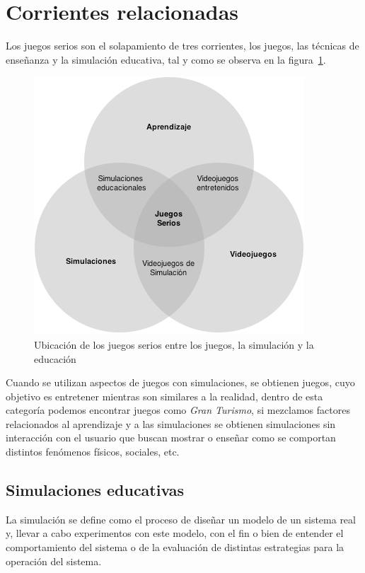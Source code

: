 \section{Corrientes relacionadas}

Los juegos serios son el solapamiento de tres corrientes, los juegos, las
técnicas de enseñanza y la simulación educativa\cite{education:games}, tal y
como se observa en la figura~\ref{fig:corrientes_relacionadas}. 

\begin{figure}[ht]
\centering
\includegraphics[scale=0.5]{juegos_serios/corrientes_paralelas.png}
\caption{Ubicación de los juegos serios entre los juegos, la simulación y la educación}
\label{fig:corrientes_relacionadas}
\end{figure}

Cuando se utilizan aspectos de juegos con simulaciones, se obtienen juegos, cuyo
objetivo es entretener mientras son similares a la realidad, dentro de esta
categoría podemos encontrar juegos como \emph{Gran Turismo}, si mezclamos
factores relacionados al aprendizaje y a las simulaciones se obtienen
simulaciones sin interacción con el usuario que buscan mostrar o enseñar como se
comportan distintos fenómenos físicos, sociales, etc.


\subsection{Simulaciones educativas}

La simulación se define como el proceso de diseñar un modelo de un sistema real
y, llevar a cabo experimentos con este modelo, con el fin o bien de entender el
comportamiento del sistema o de la evaluación de distintas estrategias para la
operación del sistema\cite{ingalls2008introduction}. 

